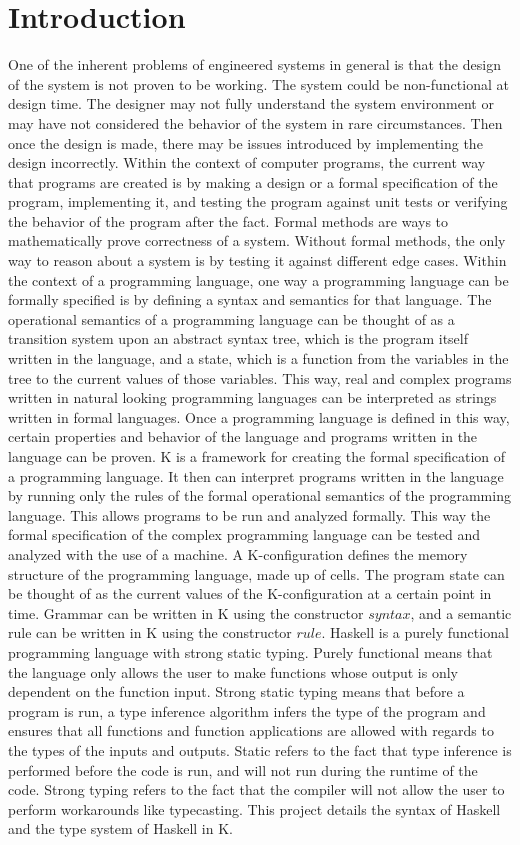 \chapter{Introduction}
One of the inherent problems of engineered systems in general is that the design of the system is not proven to be working. The system could be non-functional at design time. The designer may not fully understand the system environment or may have not considered the behavior of the system in rare circumstances. Then once the design is made, there may be issues introduced by implementing the design incorrectly.
Within the context of computer programs, the current way that programs are created is by making a design or a formal specification of the program, implementing it, and testing the program against unit tests or verifying the behavior of the program after the fact.
Formal methods are ways to mathematically prove correctness of a system. Without formal methods, the only way to reason about a system is by testing it against different edge cases.
Within the context of a programming language, one way a programming language can be formally specified is by defining a syntax and semantics for that language.
The operational semantics of a programming language can be thought of as a transition system upon an abstract syntax tree, which is the program itself written in the language, and a state, which is a function from the variables in the tree to the current values of those variables. 
This way, real and complex programs written in natural looking programming languages can be interpreted as strings written in formal languages. Once a programming language is defined in this way, certain properties and behavior of the language and programs written in the language can be proven.
K is a framework for creating the formal specification of a programming language. It then can interpret programs written in the language by running only the rules of the formal operational semantics of the programming language. This allows programs to be run and analyzed formally. This way the formal specification of the complex programming language can be tested and analyzed with the use of a machine.
A K-configuration defines the memory structure of the programming language, made up of cells. The program state can be thought of as the current values of the K-configuration at a certain point in time.
Grammar can be written in K using the constructor $syntax$, and a semantic rule can be written in K using the constructor $rule$.
Haskell is a purely functional programming language with strong static typing. Purely functional means that the language only allows the user to make functions whose output is only dependent on the function input. Strong static typing means that before a program is run, a type inference algorithm infers the type of the program and ensures that all functions and function applications are allowed with regards to the types of the inputs and outputs. Static refers to the fact that type inference is performed before the code is run, and will not run during the runtime of the code. Strong typing refers to the fact that the compiler will not allow the user to perform workarounds like typecasting.
This project details the syntax of Haskell and the type system of Haskell in K.

